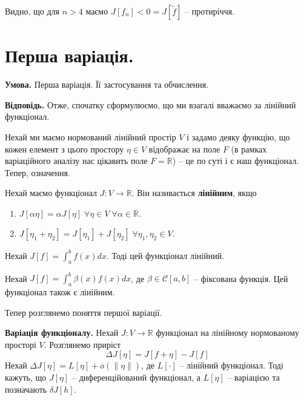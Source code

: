 \documentclass[14pt]{extarticle}
\newcommand{\<}{\langle}
\renewcommand{\>}{\rangle}
\theoremstyle{mystyle}{\newtheorem{definition}{Definition}[section]}
\theoremstyle{mystyle}{\newtheorem{proposition}[definition]{Proposition}}
\theoremstyle{mystyle}{\newtheorem{theorem}[definition]{Theorem}}
\theoremstyle{mystyle}{\newtheorem{lemma}[definition]{Lemma}}
\theoremstyle{mystyle}{\newtheorem{corollary}[definition]{Corollary}}
\theoremstyle{mystyle}{\newtheorem*{remark}{Remark}}
\theoremstyle{mystyle}{\newtheorem*{remarks}{Remarks}}
\theoremstyle{mystyle}{\newtheorem*{example}{Example}}
\theoremstyle{mystyle}{\newtheorem*{examples}{Examples}}
\theoremstyle{definition}{\newtheorem*{exercise}{Exercise}}
\theoremstyle{cstyle}{\newtheorem*{cthm}{}}
\theoremstyle{warn}
\begin{document}
Видно, що для $n>4$ маємо $J[f_n]<0=J[\widetilde{f}]$ -- протиріччя.

\pagebreak

\section{Перша варіація.}

\textbf{Умова.} Перша варіація. Її застосування та обчислення.

\textbf{Відповідь.} Отже, спочатку сформулюємо, що ми взагалі вважаємо за лінійний функціонал.

Нехай ми маємо нормований лінійний простір $V$ і задамо деяку функцію, що кожен елемент
з цього простору $\eta \in V$ відображає на поле $F$ (в рамках варіаційного аналізу
нас цікавить поле $F = \mathbb{R}$) -- це по суті і є наш функціонал. Тепер, означення.

\begin{definition}
    Нехай маємо функціонал $J: V \to \mathbb{R}$. Він називається \textbf{лінійним}, якщо
    \begin{enumerate}
        \item $J[\alpha\eta] = \alpha J[\eta] \; \forall \eta \in V \; \forall \alpha \in \mathbb{R}$.
        \item $J[\eta_1+\eta_2] = J[\eta_1] + J[\eta_2] \; \forall \eta_1,\eta_2 \in V$.
    \end{enumerate}
\end{definition}

\begin{example}
    Нехай $J[f] = \int_a^b f(x)dx$. Тоді цей функціонал лінійний.
\end{example}

\begin{example}
    Нехай $J[f] = \int_a^b \beta(x)f(x)dx$, де $\beta \in \mathcal{C}[a,b]$ -- фіксована функція. Цей функціонал також є лінійним.
\end{example}

Тепер розглянемо поняття першої варіації.

\begin{definition} \textbf{Варіація функціоналу.} Нехай $J: V \to \mathbb{R}$ функціонал на лінійному нормованому просторі $V$. Розглянемо приріст 
    \begin{equation}
        \Delta J[\eta] = J[f+\eta]-J[f]
    \end{equation}
    Нехай $\Delta J[\eta] = L[\eta] + \overline{o}(\|\eta\|)$, де $L[\cdot]$ -- лінійний функціонал. Тоді кажуть, що $J[\eta]$ -- диференційований функціонал, а $L[\eta]$ -- варіацією та позначають $\delta J[h]$. 
\end{definition}
\end{document}
